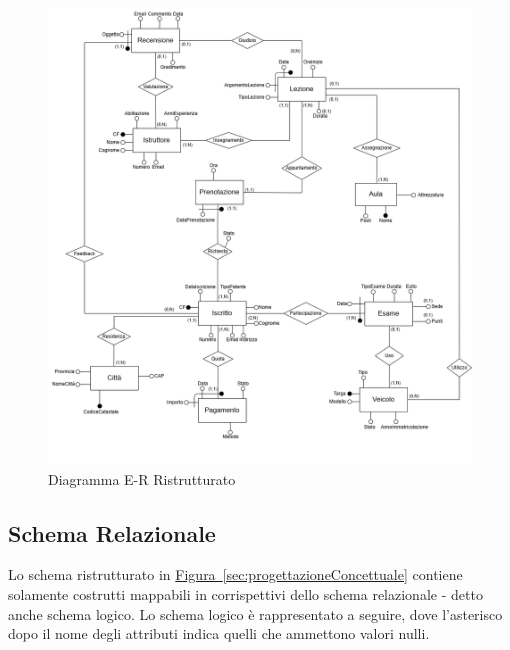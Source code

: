 \documentclass[10pt,twoside]{article}
\begin{document}
{    \newpage

    \begin{figure}[H]        
        \includegraphics[width=1\linewidth]{img/ER_ScuolaGuidaRistrutturato.drawio}\centering
        \caption{Diagramma E-R Ristrutturato}
        \label{fig:diagrammaERristrutturato}
    \end{figure}

    \subsection{Schema Relazionale}{
        Lo schema ristrutturato in \hyperref[sec:progettazioneConcettuale]{Figura~\ref*{sec:progettazioneConcettuale}} contiene solamente costrutti mappabili in corrispettivi dello schema relazionale - detto anche schema logico. Lo schema logico è rappresentato a seguire, dove l’asterisco dopo il nome degli attributi indica quelli che ammettono valori nulli.

}}
\end{document}
